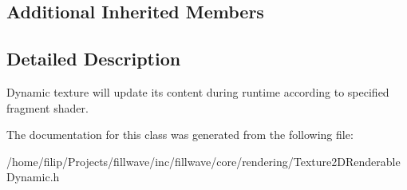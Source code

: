 \subsection*{Additional Inherited Members}


\subsection{Detailed Description}
Dynamic texture will update its content during runtime according to specified fragment shader. 

The documentation for this class was generated from the following file\+:\begin{DoxyCompactItemize}
\item 
/home/filip/\+Projects/fillwave/inc/fillwave/core/rendering/Texture2\+D\+Renderable\+Dynamic.\+h\end{DoxyCompactItemize}

